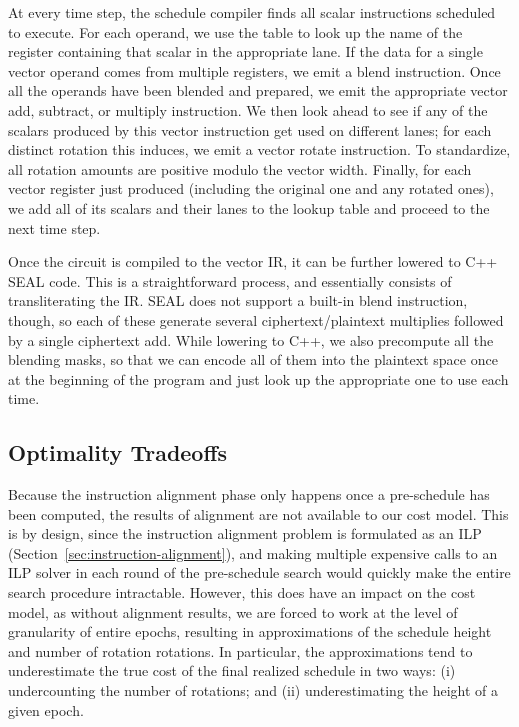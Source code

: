 At every time step, the schedule compiler finds all scalar instructions scheduled to execute.
For each operand, we use the table to look up the name of the register containing that scalar in the appropriate lane.
If the data for a single vector operand comes from multiple registers, we emit a blend instruction.
Once all the operands have been blended and prepared, we emit the appropriate vector add, subtract, or multiply instruction.
We then look ahead to see if any of the scalars produced by this vector instruction get used on different lanes; for each distinct rotation this induces, we emit a vector rotate instruction.
To standardize, all rotation amounts are positive modulo the vector width.
Finally, for each vector register just produced (including the original one and any rotated ones), we add all of its scalars and their lanes to the lookup table and proceed to the next time step.

Once the circuit is compiled to the vector IR, it can be further lowered to C++ SEAL code.
This is a straightforward process, and essentially consists of transliterating the IR. 
SEAL does not support a built-in blend instruction, though, so each of these generate several ciphertext/plaintext multiplies followed by a single ciphertext add.
While lowering to C++, we also precompute all the blending masks, so that we can encode all of them into the plaintext space once at the beginning of the program and just look up the appropriate one to use each time.

\subsection{Optimality Tradeoffs}\label{sec:optimality-tradeoffs} 
Because the instruction alignment phase only happens once a pre-schedule has been computed, the results of alignment are not available to our cost model.
This is by design, since the instruction alignment problem is formulated as an ILP (Section~\ref{sec:instruction-alignment}), and making multiple expensive calls to an ILP solver in each round of the pre-schedule search would quickly make the entire search procedure intractable.
However, this does have an impact on the cost model, as without alignment results, we are forced to work at the level of granularity of entire epochs, resulting in approximations of the schedule height and number of rotation rotations.
In particular, the approximations tend to underestimate the true cost of the final realized schedule in two ways: (i) undercounting the number of rotations; and (ii) underestimating the height of a given epoch.

